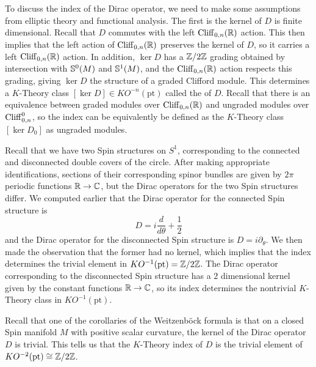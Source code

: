 %
To discuss the index of the Dirac operator, we need to make some assumptions from
elliptic theory and functional analysis. The first is the kernel of $D$ is finite
dimensional. Recall that $D$ commutes with the left $\Cliff_{0,n}(\R)$ action.
This then implies that the left action of $\Cliff_{0,n}(\R)$ preserves the kernel of
$D$, so it carries a left $\Cliff_{0,n}(\R)$ action. In addition, $\ker D$ has a
$\Z/2\Z$ grading obtained by intersection with $\S^0(M)$ and $\S^1(M)$, and the
$\Cliff_{0,n}(\R)$ action respects this grading, giving $\ker D$ the structure of a
graded Clifford module. This determines a $K$-Theory class
$[\ker D] \in KO^{-n}(\mathrm{pt})$ called the  of $D$. Recall that
there is an equivalence between graded modules over $\Cliff_{0,n}(\R)$ and
ungraded modules over $\Cliff_{0,n}^0$, so the index can be equivalently be
defined as the $K$-Theory class $[\ker D_0]$ as ungraded modules.
%
\begin{exmp}
Recall that we have two Spin structures on $S^1$, corresponding to the connected
and disconnected double covers of the circle. After making appropriate identifications,
sections of their corresponding spinor bundles are given by $2\pi$ periodic functions
$\R \to \C$, but the Dirac operators for the two Spin structures differ. We computed
earlier that the Dirac operator for the connected Spin structure is
\[
D = i\frac{d}{d\theta} + \frac{1}{2}
\]
and the Dirac operator for the disconnected Spin structure is $D = i\partial_\theta$.
We then made the observation that the former had no kernel, which implies that
the index determines the trivial element in $KO^{-1}(\mathrm{pt}) = \Z/2\Z$.
The Dirac operator corresponding to the disconnected Spin structure has a
$2$ dimensional kernel given by the constant functions $\R \to \C$, so its
index determines the nontrivial $K$-Theory class in $KO^{-1}(\mathrm{pt})$.
\end{exmp}
%
\begin{exmp}
Recall that one of the corollaries of the Weitzenb\"ock formula is that on a closed
Spin manifold $M$ with positive scalar curvature, the kernel of the Dirac operator $D$
is trivial. This tells us that the $K$-Theory index of $D$ is the trivial element of
$KO^{-2}(\mathrm{pt}) \cong \Z/2\Z$.
\end{exmp}
%
